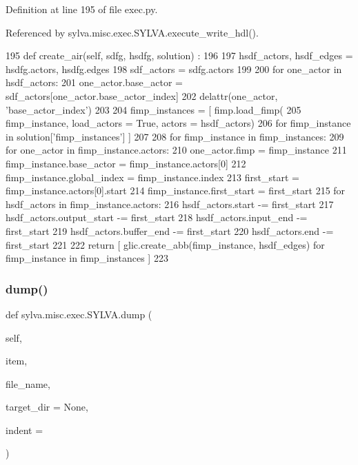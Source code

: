 Definition at line 195 of file exec.\+py.



Referenced by sylva.\+misc.\+exec.\+S\+Y\+L\+V\+A.\+execute\+\_\+write\+\_\+hdl().


\begin{DoxyCode}
195   \textcolor{keyword}{def }create\_air(self, sdfg, hsdfg, solution) :
196 
197     hsdf\_actors, hsdf\_edges = hsdfg.actors, hsdfg.edges
198     sdf\_actors = sdfg.actors
199 
200     \textcolor{keywordflow}{for} one\_actor \textcolor{keywordflow}{in} hsdf\_actors:
201       one\_actor.base\_actor = sdf\_actors[one\_actor.base\_actor\_index]
202       delattr(one\_actor, \textcolor{stringliteral}{'base\_actor\_index'})
203 
204     fimp\_instances = [ fimp.load\_fimp(
205       fimp\_instance, load\_actors = \textcolor{keyword}{True}, actors = hsdf\_actors)
206       \textcolor{keywordflow}{for} fimp\_instance \textcolor{keywordflow}{in} solution[\textcolor{stringliteral}{'fimp\_instances'}] ]
207 
208     \textcolor{keywordflow}{for} fimp\_instance \textcolor{keywordflow}{in} fimp\_instances:
209       \textcolor{keywordflow}{for} one\_actor \textcolor{keywordflow}{in} fimp\_instance.actors:
210         one\_actor.fimp = fimp\_instance
211       fimp\_instance.base\_actor = fimp\_instance.actors[0]
212       fimp\_instance.global\_index = fimp\_instance.index
213       first\_start = fimp\_instance.actors[0].start
214       fimp\_instance.first\_start = first\_start
215       \textcolor{keywordflow}{for} hsdf\_actors \textcolor{keywordflow}{in} fimp\_instance.actors:
216         hsdf\_actors.start -= first\_start
217         hsdf\_actors.output\_start -= first\_start
218         hsdf\_actors.input\_end -= first\_start
219         hsdf\_actors.buffer\_end -= first\_start
220         hsdf\_actors.end -= first\_start
221 
222     \textcolor{keywordflow}{return} [ glic.create\_abb(fimp\_instance, hsdf\_edges) \textcolor{keywordflow}{for} fimp\_instance \textcolor{keywordflow}{in} fimp\_instances ]
223 
\end{DoxyCode}
\mbox{\label{classsylva_1_1misc_1_1exec_1_1_s_y_l_v_a_a069be4000eb357f5b2088f408ded6ef0}} 
\subsubsection{\texorpdfstring{dump()}{dump()}}
{\footnotesize\ttfamily def sylva.\+misc.\+exec.\+S\+Y\+L\+V\+A.\+dump (\begin{DoxyParamCaption}\item[{}]{self,  }\item[{}]{item,  }\item[{}]{file\+\_\+name,  }\item[{}]{target\+\_\+dir = {\ttfamily None},  }\item[{}]{indent = {} }\end{DoxyParamCaption})}



